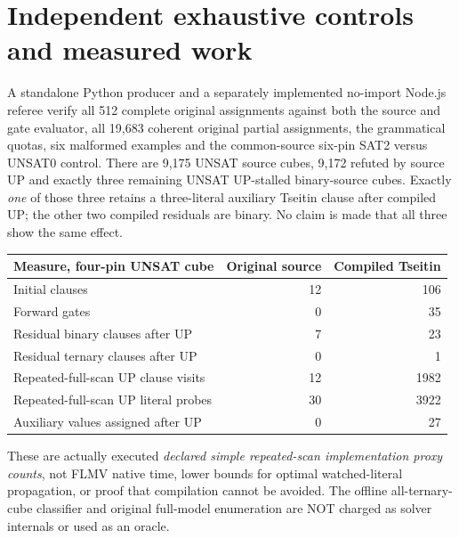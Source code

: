 \documentclass[11pt]{article}
\begin{document}
\section{Independent exhaustive controls and measured work}
A standalone Python producer and a separately implemented no-import Node.js referee verify all 512 complete original assignments against both the source and gate evaluator, all 19,683 coherent original partial assignments, the grammatical quotas, six malformed examples and the common-source six-pin SAT2 versus UNSAT0 control. There are 9,175 UNSAT source cubes, 9,172 refuted by source UP and exactly three remaining UNSAT UP-stalled binary-source cubes. Exactly \emph{one} of those three retains a three-literal auxiliary Tseitin clause after compiled UP; the other two compiled residuals are binary. No claim is made that all three show the same effect.

\begin{center}\small\begin{tabular}{lrr}
\toprule Measure, four-pin UNSAT cube & Original source & Compiled Tseitin\\
\midrule Initial clauses &12&106\\
Forward gates &0&35\\
Residual binary clauses after UP &7&23\\
Residual ternary clauses after UP &0&1\\
Repeated-full-scan UP clause visits &12&1982\\
Repeated-full-scan UP literal probes &30&3922\\
Auxiliary values assigned after UP &0&27\\
\bottomrule
\end{tabular}\end{center}
These are actually executed \emph{declared simple repeated-scan implementation proxy counts}, not FLMV native time, lower bounds for optimal watched-literal propagation, or proof that compilation cannot be avoided. The offline all-ternary-cube classifier and original full-model enumeration are NOT charged as solver internals or used as an oracle.
\end{document}
